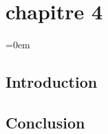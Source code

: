 \chapter{chapitre 4} 
\begingroup
\parindent=0em
\localtableofcontents 
\endgroup
\newpage



\section{Introduction}
\section{Conclusion}
